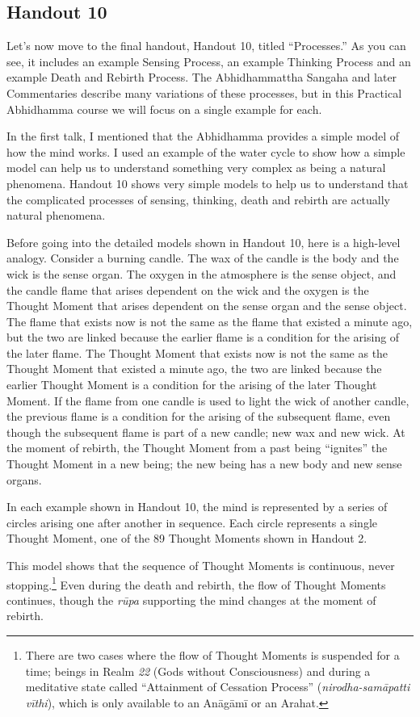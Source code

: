 \subsection*{Handout 10}

Let’s now move to the final handout, Handout 10, titled “Processes.” As you can see, it includes an example Sensing Process, an example Thinking Process and an example Death and Rebirth Process. The Abhidhammattha Sangaha and later Commentaries describe many variations of these processes, but in this Practical Abhidhamma course we will focus on a single example for each.

In the first talk, I mentioned that the Abhidhamma provides a simple model of how the mind works. I used an example of the water cycle to show how a simple model can help us to understand something very complex as being a natural phenomena. Handout 10 shows very simple models to help us to understand that the complicated processes of sensing, thinking, death and rebirth are actually natural phenomena.

Before going into the detailed models shown in Handout 10, here is a high-level analogy. Consider a burning candle. The wax of the candle is the body and the wick is the sense organ. The oxygen in the atmosphere is the sense object, and the candle flame that arises dependent on the wick and the oxygen is the Thought Moment that arises dependent on the sense organ and the sense object. The flame that exists now is not the same as the flame that existed a minute ago, but the two are linked because the earlier flame is a condition for the arising of the later flame. The Thought Moment that exists now is not the same as the Thought Moment that existed a minute ago, the two are linked because the earlier Thought Moment is a condition for the arising of the later Thought Moment. If the flame from one candle is used to light the wick of another candle, the previous flame is a condition for the arising of the subsequent flame, even though the subsequent flame is part of a new candle; new wax and new wick. At the moment of rebirth, the Thought Moment from a past being “ignites” the Thought Moment in a new being; the new being has a new body and new sense organs.

In each example shown in Handout 10, the mind is represented by a series of circles arising one after another in sequence. Each circle represents a single Thought Moment, one of the 89 Thought Moments shown in Handout 2.

This model shows that the sequence of Thought Moments is continuous, never stopping.\footnote{There are two cases where the flow of Thought Moments is suspended for a time; beings in Realm \textit{22} (Gods without Consciousness) and during a meditative state called “Attainment of Cessation Process” (\textit{nirodha-samāpatti vīthi}), which is only available to an Anāgāmī or an Arahat.} Even during the death and rebirth, the flow of Thought Moments continues, though the \textit{rūpa} supporting the mind changes at the moment of rebirth.

